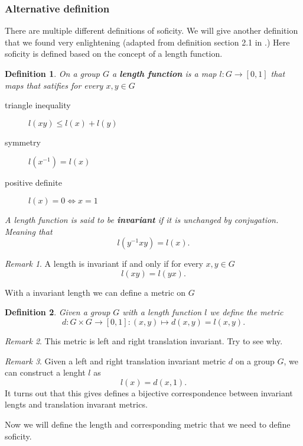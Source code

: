 \documentclass[titlepage, a4paper]{article}
\newtheorem{definition}{Definition}
\theoremstyle{remark}
\newtheorem{remark}{Remark}
\begin{document}
	\subsubsection{Alternative definition}
	There are multiple different definitions of soficity. 
	We will give another definition that we found very enlightening (adapted from definition section 2.1 in \cite{capraro_lupini_2015}.)
	Here soficity is defined based on the concept of a length function.
	\begin{definition}
		On a group $G$ a \textbf{length function} is a map $l: G \to [0,1]$ that maps that satifies for every  $x, y \in G$
		\begin{description}
			\item[triangle inequality] $l(xy) \le l(x) + l(y)$
			\item[symmetry]  $l(x^{-1}) = l(x)$
			\item[positive definite] $l(x) = 0 \iff x =1$
		\end{description}
		A length function is said to be \textbf{invariant} if it is unchanged by conjugation. Meaning that \[
			l(y^{-1}xy) = l(x)
		.\] 
	\end{definition}
	\begin{remark}
		A length is invariant if and only if for every $x, y \in G$ \[
			l(xy) = l(yx)
		.\] 
	\end{remark}
	
	With a invariant length we can define a metric on $G$
	 \begin{definition}
	 Given a group $G$ with a length function $l$ we define the metric \[d: G\times G \to [0,1]: (x,y) \mapsto d(x,y) = l(x,y). \]
	\end{definition}
	\begin{remark}
		This metric is left and right translation invariant. Try to see why.
	\end{remark}
	\begin{remark}
		Given a left and right translation invariant metric $d$ on a group  $G$, we can construct a lenght  $l$ as  \[
			l(x) = d(x, 1)
		.\] 
		It turns out that this gives defines a bijective correspondence between invariant lengts and translation invarant metrics. 
	\end{remark}
	
	Now we will define the length and corresponding metric that we need to define soficity.
\end{document}
